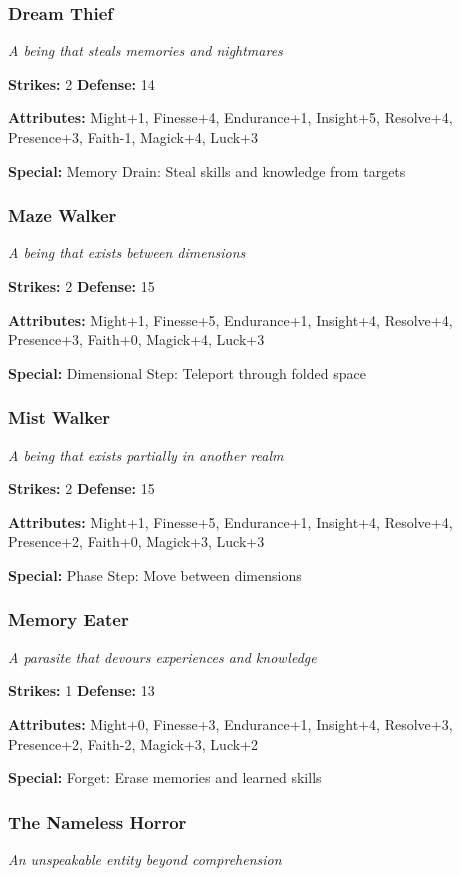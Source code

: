 \documentclass[10pt,twoside]{article}
\begin{document}
\subsubsection{Dream Thief}
\textit{A being that steals memories and nightmares}

\textbf{Strikes:} 2 \quad \textbf{Defense:} 14

\textbf{Attributes:} Might+1, Finesse+4, Endurance+1, Insight+5, Resolve+4, Presence+3, Faith-1, Magick+4, Luck+3

\textbf{Special:} Memory Drain: Steal skills and knowledge from targets

\subsubsection{Maze Walker}
\textit{A being that exists between dimensions}

\textbf{Strikes:} 2 \quad \textbf{Defense:} 15

\textbf{Attributes:} Might+1, Finesse+5, Endurance+1, Insight+4, Resolve+4, Presence+3, Faith+0, Magick+4, Luck+3

\textbf{Special:} Dimensional Step: Teleport through folded space

\subsubsection{Mist Walker}
\textit{A being that exists partially in another realm}

\textbf{Strikes:} 2 \quad \textbf{Defense:} 15

\textbf{Attributes:} Might+1, Finesse+5, Endurance+1, Insight+4, Resolve+4, Presence+2, Faith+0, Magick+3, Luck+3

\textbf{Special:} Phase Step: Move between dimensions

\subsubsection{Memory Eater}
\textit{A parasite that devours experiences and knowledge}

\textbf{Strikes:} 1 \quad \textbf{Defense:} 13

\textbf{Attributes:} Might+0, Finesse+3, Endurance+1, Insight+4, Resolve+3, Presence+2, Faith-2, Magick+3, Luck+2

\textbf{Special:} Forget: Erase memories and learned skills

\subsubsection{The Nameless Horror}
\textit{An unspeakable entity beyond comprehension}
\end{document}
